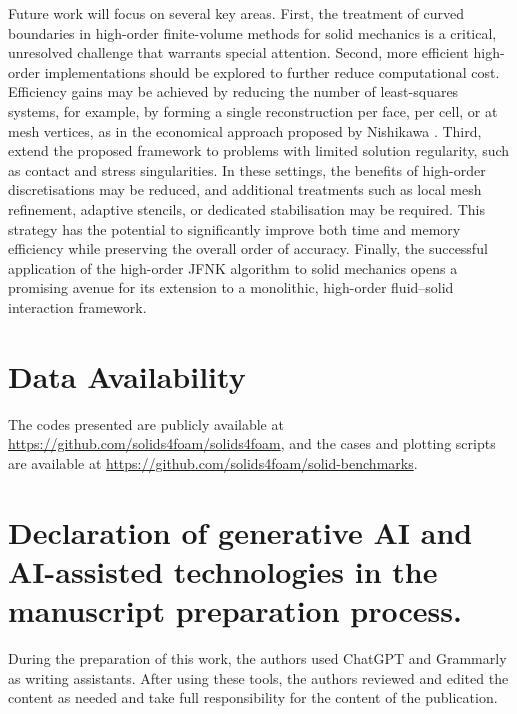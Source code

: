 \documentclass[review,3p]{elsarticle}
\begin{document}
Future work will focus on several key areas. First, the treatment of curved boundaries in high-order finite-volume methods for solid mechanics is a critical, unresolved challenge that warrants special attention. 
Second, more efficient high-order implementations should be explored to further reduce computational cost. Efficiency gains may be achieved by reducing the number of least-squares systems, for example, by forming a single reconstruction per face, per cell, or at mesh vertices, as in the economical approach proposed by Nishikawa \cite{Nishikawa2025}. {\color{orange}Third, extend the proposed framework to problems with limited solution regularity, such as contact and stress singularities. In these settings, the benefits of high-order discretisations may be reduced, and additional treatments such as local mesh refinement, adaptive stencils, or dedicated stabilisation may be required.} This strategy has the potential to significantly improve both time and memory efficiency while preserving the overall order of accuracy.
Finally, the successful application of the high-order JFNK algorithm to solid mechanics opens a promising avenue for its extension to a monolithic, high-order fluid–solid interaction framework.
%
%
%
%
\section*{Data Availability}
%
The codes presented are publicly available at \url{https://github.com/solids4foam/solids4foam}, and the cases and plotting scripts are available at \url{https://github.com/solids4foam/solid-benchmarks}.
%
\section*{Declaration of generative AI and AI-assisted technologies in the manuscript preparation process.}
%
During the preparation of this work, the authors used ChatGPT and Grammarly as writing assistants.
After using these tools, the authors reviewed and edited the content as needed and take full responsibility for the content of the publication.
%
\end{document}
